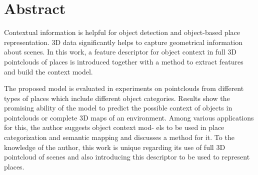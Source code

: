\cleardoublepage
{}
{}
\chapter*{Abstract}
Contextual information is helpful for object detection and object-based place
representation. 3D data significantly helps to capture geometrical information
about scenes. In this work, a feature descriptor for object context in full 3D
pointclouds of places is introduced together with a method to extract features
and build the context model. 


The proposed model is evaluated in experiments
on pointclouds from different types of places which include different object
categories. Results show the promising ability of the model to predict the possible context of objects in pointclouds or complete 3D maps of an environment.
Among various applications for this, the author suggests object context mod-
els to be used in place categorization and semantic mapping and discusses a
method for it. To the knowledge of the author, this work is unique regarding
its use of full 3D pointcloud of scenes and also introducing this descriptor to
be used to represent places.
